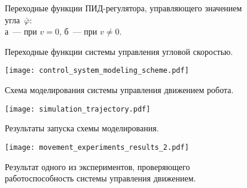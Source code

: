 \begin{figure}[h!]
    \caption{Переходные функции ПИД-регулятора, управляющего значением угла~$\bar{\varphi}$:\\ а~--- при $v = 0$, б~--- при $v \ne 0$.}
    \label{img_phi_pid}
\end{figure}

\begin{figure}[h!]
    \vspace{0.0cm}
    \caption{Переходные функции системы управления угловой скоростью.}
    \label{img_angular_speed_feedworward}
\end{figure}

\begin{figure}[h!]
    \centering
    \texttt{[image: control\_system\_modeling\_scheme.pdf]}
    \vspace{0.0cm}
    \caption{Схема моделирования системы управления движением робота.}
    \label{img_control_system_modeling_scheme}
\end{figure}

\vspace{-1.2cm}

\begin{figure}[h!]
    \centering
    \texttt{[image: simulation\_trajectory.pdf]}
    \vspace{0.0cm}
    \caption{Результаты запуска схемы моделирования.}
    \label{img_simulation_trajectory}
\end{figure}

\vspace{-1.2cm}

\begin{figure}[h!]
    \centering
    \texttt{[image: movement\_experiments\_results\_2.pdf]}
    \vspace{0.0cm}
    \caption{Результат одного из экспериментов, проверяющего работоспособность системы управления движением.}
    \label{img_movement_experiments_results}
\end{figure}

\newpage \mbox{} \newpage \mbox{} \newpage \mbox{} \newpage